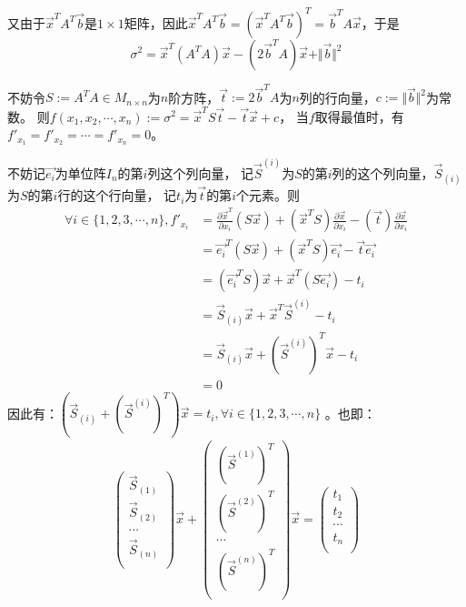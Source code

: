 \documentclass[UTF8]{ctexart}
\begin{document}
又由于$ \vec{x}^T A^T \vec{b} $是$1\times 1$矩阵，因此$ \vec{x}^T A^T \vec{b} = (\vec{x}^T A^T \vec{b})^T = \vec{b}^T A \vec{x}$，于是
$$
    \sigma^2 = \vec{x}^T (A^T A) \vec{x} - (2\vec{b}^T A) \vec{x} + \Vert \vec{b} \Vert ^2
$$

不妨令$ S:=A^T A \in M_{n\times n} $为$n$阶方阵，$ \vec{t} := 2 \vec{b}^T A $为$n$列的行向量，$c:= \Vert \vec{b} \Vert ^2$为常数。
则$f(x_1,x_2,\cdots,x_n):=\sigma^2=\vec{x}^T S \vec{t} - \vec{t} \vec{x} + c$，
当$f$取得最值时，有$f'_{x_1}=f'_{x_2}=\cdots=f'_{x_n}=0$。

不妨记$\vec{e_i}$为单位阵$I_n$的第$i$列这个列向量，
记$\vec{S}^{(i)}$为$S$的第$i$列的这个列向量，$\vec{S}_{(i)}$为$S$的第$i$行的这个行向量，
记$t_i$为$\vec{t}$的第$i$个元素。则
\begin{align*}
    \forall i \in \{1,2,3,\cdots,n\},f'_{x_i}&=\frac{\partial\vec{x}^T}{\partial{x_i}}(S\vec{x})+(\vec{x}^T S)\frac{\partial\vec{x}}{\partial{x_i}}-(\vec{t})\frac{\partial\vec{x}}{\partial{x_i}}\\
    &=\vec{e_i}^T (S\vec{x})+(\vec{x}^T S)\vec{e_i}-\vec{t}\vec{e_i}\\
    &=(\vec{e_i}^T S)\vec{x}+\vec{x}^T(S \vec{e_i})-t_i\\
    &=\vec{S}_{(i)}\vec{x}+\vec{x}^T\vec{S}^{(i)}-t_i\\
    &=\vec{S}_{(i)}\vec{x}+(\vec{S}^{(i)})^T\vec{x}-t_i\\
    &=0
\end{align*}
因此有：$ (\vec{S}_{(i)}+(\vec{S}^{(i)})^T)\vec{x}=t_i ,\forall i \in \{1,2,3,\cdots,n\}$
。也即：
\begin{align*}
    \left(\begin{matrix}
        \vec{S}_{(1)}\\
        \vec{S}_{(2)}\\
        \cdots\\
        \vec{S}_{(n)}\\
    \end{matrix}\right)
    \vec{x}+
    \left(\begin{matrix}
        (\vec{S}^{(1)})^T\\
        (\vec{S}^{(2)})^T\\
        \cdots\\
        (\vec{S}^{(n)})^T\\
    \end{matrix}\right)
    \vec{x}=
    \left(\begin{matrix}
        t_1\\
        t_2\\
        \cdots\\
        t_n\\
    \end{matrix}\right)
\end{align*}
\end{document}
